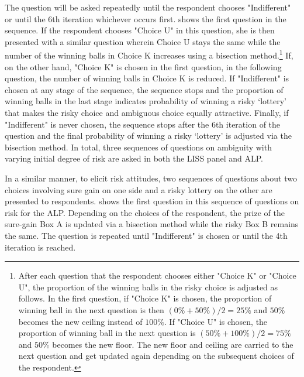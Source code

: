 \documentclass[]{article}
\begin{document}
The question will be asked repeatedly until the respondent chooses "Indifferent" or until the 6th iteration whichever occurs first.  shows the first question in the sequence. If the respondent chooses "Choice U" in this question, she is then presented with a similar question wherein Choice U stays the same while the number of the winning balls in Choice K increases using a bisection method.\footnote{After each question that the respondent chooses either "Choice K" or "Choice U", the proportion of the winning balls in the risky choice is adjusted as follows. In the first question, if "Choice K" is chosen, the proportion of winning ball in the next question is then $(0\% + 50\%)/2 = 25\%$ and $50\%$ becomes the new ceiling instead of $100\%$. If "Choice U" is chosen, the proportion of winning ball in the next question is $(50\% + 100\%)/2 = 75\%$ and $50\%$ becomes the new floor. The new floor and ceiling are carried to the next question and get updated again depending on the subsequent choices of the respondent.} If, on the other hand, "Choice K" is chosen in the first question, in the following question, the number of winning balls in Choice K is reduced. If "Indifferent" is chosen at any stage of the sequence, the sequence stops and the proportion of winning balls in the last stage indicates probability of winning a risky `lottery' that makes the risky choice and ambiguous choice equally attractive. Finally, if "Indifferent" is never chosen, the sequence stops after the 6th iteration of the question and the final probability of winning a risky `lottery' is adjusted via the bisection method. In total, three sequences of questions on ambiguity with varying initial degree of risk are asked in both the LISS panel and ALP.

In a similar manner, to elicit risk attitudes, two sequences of questions about two choices involving sure gain on one side and a risky lottery on the other are presented to respondents.  shows the first question in this sequence of questions on risk for the ALP. Depending on the choices of the respondent, the prize of the sure-gain Box A is updated via a bisection method while the risky Box B remains the same. The question is repeated until "Indifferent" is chosen or until the 4th iteration is reached.
\end{document}
